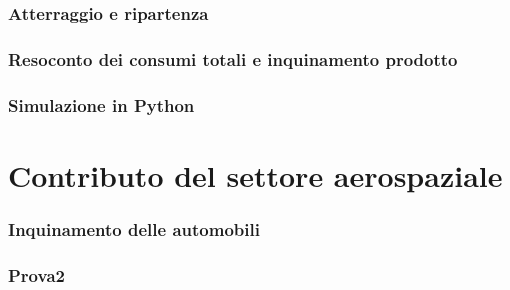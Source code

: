 \documentclass[11pt]{article}
\begin{document}
\section{Atterraggio e ripartenza}

\section{Resoconto dei consumi totali e inquinamento prodotto}

\section{Simulazione in Python}

\newpage
\part{Contributo del settore aerospaziale}
\setcounter{section}{0}
\section{Inquinamento delle automobili}

\section{Prova2}
\printbibliography
\end{document}
